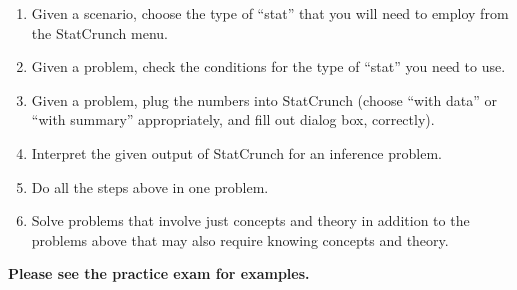 \documentclass{article}
\begin{document}
\begin{enumerate}
\item Given a scenario, choose the type of ``stat'' that you will need
  to employ from the StatCrunch menu.
\item Given a problem, check the conditions for the type of ``stat''
  you need to use.
\item Given a problem, plug the numbers into StatCrunch (choose ``with
  data'' or ``with summary'' appropriately, and fill out dialog box,
  correctly).
\item Interpret the given output of StatCrunch for an inference problem.
\item Do all the steps above in one problem.
\item Solve problems that involve just concepts and theory in addition
  to the problems above that may also require knowing concepts and
  theory.
\end{enumerate}
\textbf{Please see the practice exam for examples.}
\end{document}
